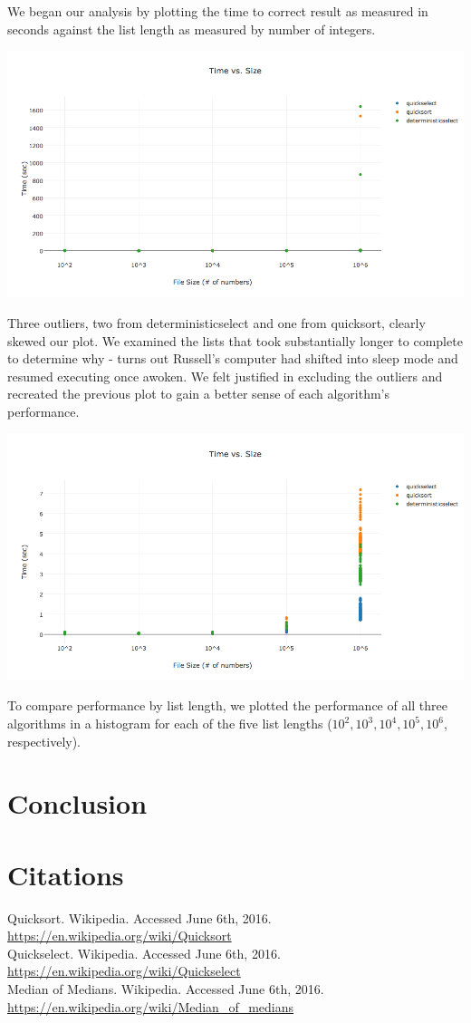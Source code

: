 \documentclass{article}
\begin{document}
\indent \indent We began our analysis by plotting the time to correct result as measured in seconds against the list length as measured by number of integers.

\includegraphics[scale=0.45]{resultsWoutliers}

Three outliers, two from deterministicselect and one from quicksort, clearly skewed our plot. We examined the lists that took substantially longer to complete to determine why - turns out Russell's computer had shifted into sleep mode and resumed executing once awoken. We felt justified in excluding the outliers and recreated the previous plot to gain a better sense of each algorithm's performance.

\includegraphics[scale=.45]{results}

To compare performance by list length, we plotted the performance of all three algorithms in a histogram for each of the five list lengths ($10^2, 10^3, 10^4, 10^5, 10^6$, respectively).

\section*{Conclusion}

\section*{Citations}
Quicksort. Wikipedia. Accessed June 6th, 2016. \url{https://en.wikipedia.org/wiki/Quicksort}\\

\noindent Quickselect. Wikipedia. Accessed June 6th, 2016. \url{https://en.wikipedia.org/wiki/Quickselect}\\

\noindent Median of Medians. Wikipedia. Accessed June 6th, 2016. \url{https://en.wikipedia.org/wiki/Median_of_medians}
\end{document}
